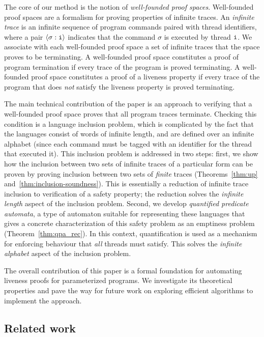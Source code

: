 \documentclass[9pt,nocopyrightspace]{sigplanconf}
\theoremstyle{definition}
\newcommand{\tuple}[1]{\langle #1 \rangle}
\newcommand{\idx}[1]{\text{\rm\texttt{#1}}}
\newcommand{\ic}[2]{{\tuple{#1 : #2}}}
\begin{document}
The core of our method is the notion of \emph{well-founded proof spaces}.
Well-founded proof spaces are a formalism for proving properties of infinite
traces.  An \emph{infinite trace} is an infinite sequence of program commands
paired with thread identifiers, where a pair $\ic{\sigma}{\idx{i}}$ indicates
that the command $\sigma$ is executed by thread $\idx{i}$.  We associate with
each well-founded proof space a set of infinite traces that the space proves
to be terminating.  A well-founded proof space constitutes a proof of program
termination if every trace of the program is proved terminating.  A well-founded proof space
constitutes a proof of a liveness property if every trace of the program that
does \emph{not} satisfy the liveness property is proved terminating.




The main technical contribution of the paper is an approach to verifying that
a well-founded proof space proves that all program traces terminate.  Checking this condition is a language inclusion
problem, which is complicated by the fact that the languages consist of words
of infinite length, and are defined over an infinite alphabet (since each
command must be tagged with an identifier for the thread that executed it).
This inclusion problem
is addressed in two steps: first, we show how the inclusion between two sets
of infinite traces of a particular form can be proven by proving inclusion
between two sets of \emph{finite} traces
(Theorems~\ref{thm:up} and~\ref{thm:inclusion-soundness}).  This is essentially a reduction of
infinite trace inclusion to verification of a safety property; the reduction
solves the \emph{infinite length} aspect of the inclusion problem.  Second, we
develop \emph{quantified predicate automata}, a type of automaton suitable for
representing these languages that gives a concrete characterization of this
safety problem as an emptiness problem
(Theorem~\ref{thm:qpa_rec}).  In this context, quantification is used as a mechanism for
enforcing behaviour that \emph{all} threads must satisfy.  This solves the
\emph{infinite alphabet} aspect of the inclusion problem.

The overall contribution of this paper is a formal foundation for automating
liveness proofs for parameterized programs.  We investigate its theoretical
properties and pave the way for future work on exploring efficient algorithms
to implement the approach.





\subsection{Related work} \label{sec:relwork}
\end{document}

